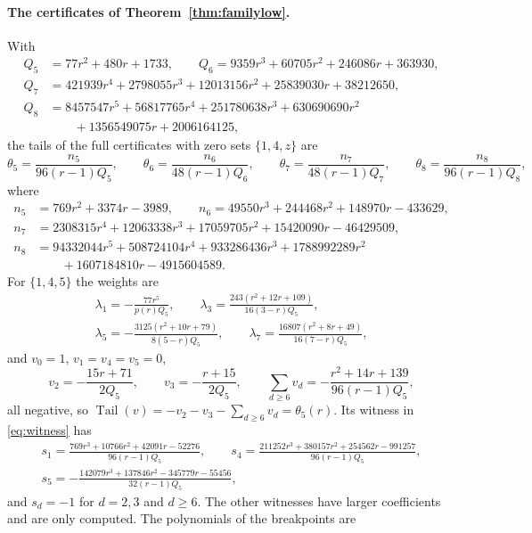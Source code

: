 \documentclass[11pt]{article}
\DeclareMathOperator{\Tail}{Tail}
\begin{document}
\paragraph{The certificates of Theorem~\ref{thm:familylow}.}  With
\begin{align*}
  Q_5&=77r^2+480r+1733,\qquad Q_6=9359r^3+60705r^2+246086r+363930,\\
  Q_7&=421939r^4+2798055r^3+12013156r^2+25839030r+38212650,\\
  Q_8&=8457547r^5+56817765r^4+251780638r^3+630690690r^2\\
  &\qquad+1356549075r+2006164125,
\end{align*}
the tails of the full certificates with zero sets $\{1,4,z\}$ are
\[
  \theta_5=\frac{n_5}{96(r-1)Q_5},\qquad
  \theta_6=\frac{n_6}{48(r-1)Q_6},\qquad
  \theta_7=\frac{n_7}{48(r-1)Q_7},\qquad
  \theta_8=\frac{n_8}{96(r-1)Q_8},
\]
where
\begin{align*}
  n_5&=769r^2+3374r-3989,\qquad n_6=49550r^3+244468r^2+148970r-433629,\\
  n_7&=2308315r^4+12063338r^3+17059705r^2+15420090r-46429509,\\
  n_8&=94332044r^5+508724104r^4+933286436r^3+1788992289r^2\\
  &\qquad+1607184810r-4915604589 .
\end{align*}
For $\{1,4,5\}$ the weights are
\begin{gather*}
  \lambda_1=-\frac{77r^5}{p(r)Q_5},\qquad
  \lambda_3=\frac{243(r^2+12r+109)}{16(3-r)Q_5},\\
  \lambda_5=-\frac{3125(r^2+10r+79)}{8(5-r)Q_5},\qquad
  \lambda_7=\frac{16807(r^2+8r+49)}{16(7-r)Q_5},
\end{gather*}
and $v_0=1$, $v_1=v_4=v_5=0$,
\[
  v_2=-\frac{15r+71}{2Q_5},\qquad v_3=-\frac{r+15}{2Q_5},\qquad
  \sum_{d\ge6}v_d=-\frac{r^2+14r+139}{96(r-1)Q_5},
\]
all negative, so $\Tail(v)=-v_2-v_3-\sum_{d\ge6}v_d=\theta_5(r)$.  Its witness
in \eqref{eq:witness} has
\begin{gather*}
  s_1=\frac{769r^3+10766r^2+42091r-52276}{96(r-1)Q_5},\qquad
  s_4=\frac{211252r^3+380157r^2+254562r-991257}{96(r-1)Q_5},\\
  s_5=-\frac{142079r^3+137846r^2-345779r-55456}{32(r-1)Q_5},
\end{gather*}
and $s_d=-1$ for $d=2,3$ and $d\ge6$.  The other witnesses have larger
coefficients and are only computed.  The polynomials of the breakpoints are
\end{document}
